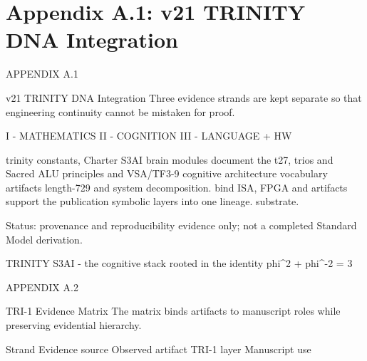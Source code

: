 
\section{Appendix A.1: v21 TRINITY DNA Integration}

APPENDIX A.1

                 v21 TRINITY DNA Integration
      Three evidence strands are kept separate so that engineering continuity cannot be
                                    mistaken for proof.

  I - MATHEMATICS                         II - COGNITION                                         III - LANGUAGE + HW

  trinity constants, Charter              S3AI brain modules document the                        t27, trios and Sacred ALU
  principles and VSA/TF3-9                cognitive architecture vocabulary                      artifacts
  length-729                              and system decomposition.                              bind ISA, FPGA and
  artifacts support the                                                                          publication
  symbolic                                                                                       layers into one lineage.
  substrate.

      Status: provenance and reproducibility evidence only; not a completed Standard Model
                                           derivation.

                           TRINITY S3AI - the cognitive stack rooted in the identity phi\textasciicircum{}2 + phi\textasciicircum{}-2 = 3

                                                            APPENDIX A.2

                                 TRI-1 Evidence Matrix
        The matrix binds artifacts to manuscript roles while preserving evidential hierarchy.

       Strand      Evidence source                 Observed artifact                    TRI-1 layer                    Manuscript use